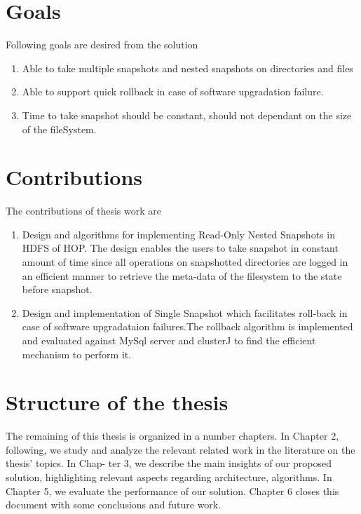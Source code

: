 \section{Goals}
Following goals are desired from the solution
\begin{enumerate}
\item Able to take multiple snapshots and nested snapshots on directories and files
\item Able to support quick rollback in case of software upgradation failure.
\item Time to take snapshot should be constant, should not dependant on the size of the fileSystem.
\end{enumerate}

\section{Contributions}
The contributions of thesis work are 
\begin{enumerate}
\item Design and algorithms for implementing Read-Only Nested Snapshots in HDFS of HOP. The design enables the users to take snapshot in constant amount of time since all operations on snapshotted directories are logged in an efficient manner to retrieve the meta-data of the filesystem to the state before snapshot.
\item Design and implementation of Single Snapshot which facilitates roll-back in case of software upgradataion failures.The rollback algorithm is implemented and evaluated against MySql server and clusterJ to find the efficient mechanism to perform it.

\end{enumerate}

\section{Structure of the thesis}
The remaining of this thesis is organized in a number chapters. In Chapter 2, following, we
study and analyze the relevant related work in the literature on the thesis’ topics. In Chap-
ter 3, we describe the main insights of our proposed solution, highlighting relevant aspects
regarding architecture, algorithms. In Chapter 5, we evaluate the performance of our solution. Chapter 6 closes this document with some conclusions and future work. 







